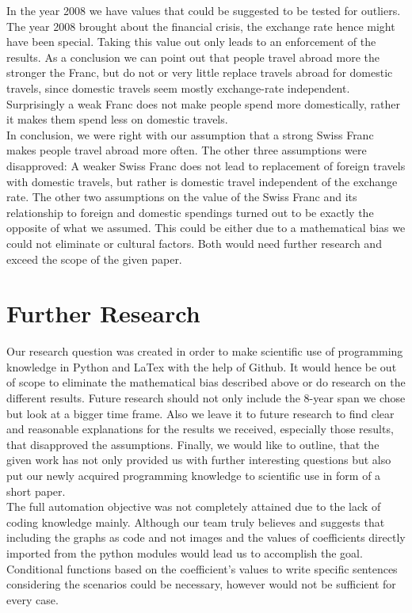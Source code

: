 \documentclass[12pt,a4paper,bibliography=totocnumbered,listof=totocnumbered]{scrartcl}
\begin{document}
In the year 2008 we have values that could be suggested to be tested for outliers. The year 2008 brought about the financial crisis, the exchange rate hence might have been special. Taking this value out only leads to an enforcement of the results. As a conclusion we can point out that people travel abroad more the stronger the Franc, but do not or very little replace travels abroad for domestic travels, since domestic travels seem mostly exchange-rate independent. \\ Surprisingly a weak Franc does not make people spend more domestically, rather it makes them spend less on domestic travels.
\ \\
 
 In conclusion, we were right with our assumption that a strong Swiss Franc makes people travel abroad more often. The other three assumptions were disapproved: A weaker Swiss Franc does not lead to replacement of foreign travels with domestic travels, but rather is domestic travel independent of the exchange rate. The other two assumptions on the value of the Swiss Franc and its relationship to foreign and domestic spendings turned out to be exactly the opposite of what we assumed. This could be either due to a mathematical bias we could not eliminate or cultural factors. Both would need further research and exceed the scope of the given paper.


\section{Further Research}
Our research question was created in order to make scientific use of programming knowledge in Python and LaTex with the help of Github. It would hence be out of scope to eliminate the mathematical bias described above or do research on the different results. Future research should not only include the 8-year span we chose but look at a bigger time frame. Also we leave it to future research to find clear and reasonable explanations for the results we received, especially those results, that disapproved the assumptions. Finally, we would like to outline, that the given work has not only provided us with further interesting questions but also put our newly acquired programming knowledge to scientific use in form of a short paper. \\

The full automation objective was not completely attained due to the lack of coding knowledge mainly. Although our team truly believes and suggests that including the graphs as code and not images and the values of coefficients directly imported from the python modules would lead us to accomplish the goal. Conditional functions based on the coefficient's values to write specific sentences considering the scenarios could be necessary, however would not be sufficient for every case.\\
\newpage
\end{document}
